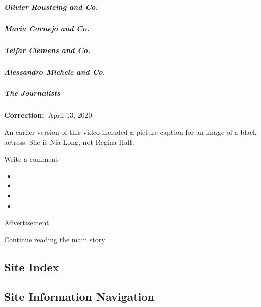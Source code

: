 \hypertarget{olivier-rousteing-and-co}{%
\subparagraph{Olivier Rousteing and
Co.}\label{olivier-rousteing-and-co}}

\href{/interactive/2020/04/13/t-magazine/maria-cornejo-olivier-rousteing-telfar-clemens-alessandro-michele.html\#maria-cornejo-and-co}{}

\hypertarget{maria-cornejo-and-co}{%
\subparagraph{Maria Cornejo and Co.}\label{maria-cornejo-and-co}}

\href{/interactive/2020/04/13/t-magazine/maria-cornejo-olivier-rousteing-telfar-clemens-alessandro-michele.html\#telfar-clemens-and-co}{}

\hypertarget{telfar-clemens-and-co}{%
\subparagraph{Telfar Clemens and Co.}\label{telfar-clemens-and-co}}

\href{/interactive/2020/04/13/t-magazine/maria-cornejo-olivier-rousteing-telfar-clemens-alessandro-michele.html\#alessandro-michele-and-co}{}

\hypertarget{alessandro-michele-and-co}{%
\subparagraph{Alessandro Michele and
Co.}\label{alessandro-michele-and-co}}

\href{/interactive/2020/04/13/t-magazine/foreign-correspondents.html}{}

\hypertarget{the-journalists}{%
\subparagraph{The Journalists}\label{the-journalists}}

\textbf{Correction:}~April 13, 2020

An earlier version of this video included a picture caption for an image
of a black actress. She is Nia Long, not Regina Hall.

Write a comment

\begin{itemize}
\item
\item
\item
\item
\end{itemize}

Advertisement

\protect\hyperlink{after-bottom}{Continue reading the main story}

\hypertarget{site-index}{%
\subsection{Site Index}\label{site-index}}

\hypertarget{site-information-navigation}{%
\subsection{Site Information
Navigation}\label{site-information-navigation}}

